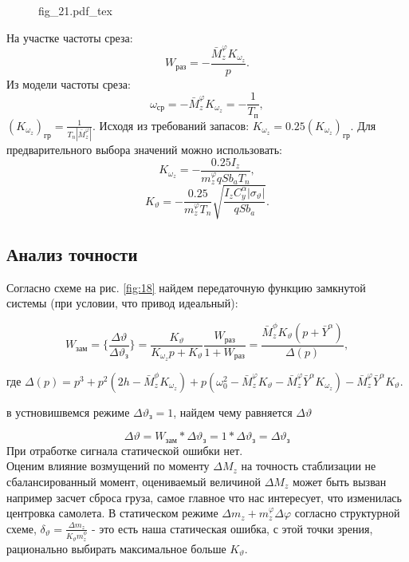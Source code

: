 \documentclass{article}
\begin{document}
\begin{figure}[H]
	\centering
	{fig_21.pdf_tex}
\end{figure}

На участке частоты среза:
\[
	W_\text{раз} = -\frac{\bar{M}_z^\varphi K_{\omega_z}}{p}.
\]
Из модели частоты среза:
\[
	\omega_\text{ср} = -\bar{M}_z^\varphi K_{\omega_z} = -\frac{1}{T_\text{п}},
\]
$(K_{\omega_z})_\text{гр} = \frac{1}{T_n |\bar{M}_z^\varphi|}.$
Исходя из требований запасов:
$K_{\omega_z} = 0.25 (K_{\omega_z})_\text{гр}.$
Для предварительного выбора значений можно использовать:
\[
	K_{\omega_z} = - \frac{0.25 I_z}{{m}_z^\varphi q S b_a T_n},
\]
\[
	K_{\vartheta} = - \frac{0.25}{{m}_z^\varphi T_n} \sqrt{\frac{I_z C_y^\alpha |\sigma_\vartheta|}{q S b_a}}.
\]

\subsection{Анализ точности}
Согласно схеме на рис. \ref{fig:18} найдем передаточную функцию замкнутой системы (при условии, что привод идеальный):

\begin{equation}
	W_\text{зам}= \{\frac{\Delta \vartheta}{\Delta \vartheta_\text{з}}\} =\frac{K_{\vartheta}}{K_{\omega_z}p +K_{\vartheta}}\frac{W_\text{раз}}{1 + W_\text{раз}} =\frac{\bar{M}_z^\phi K_{\vartheta}(p + \bar{Y}^\alpha)}{\Delta(p)},  
	\label{eq:w_zam_1}
\end{equation}

где $\Delta(p) = p^3 + p^2(2h - \bar{M}_z^\phi K_{\omega_z}) + p(\omega_0^2 -\bar{M}_z^\varphi K_\vartheta - \bar{M}_z^\varphi \bar{Y}^\alpha K_{\omega_z}) -\bar{M}_z^\varphi \bar{Y}^\alpha K_{\vartheta} $.

в устновишвемся режиме $\Delta \vartheta_\text{з} = 1$, найдем чему равняется $\Delta \vartheta$

\[
	\Delta \vartheta = W_\text{зам} * \Delta \vartheta_\text{з} = 1* \Delta \vartheta_\text{з} = \Delta \vartheta_\text{з}
\]
При отработке сигнала статической ошибки нет. \\
Оценим влияние возмущений по моменту $\Delta M_z$ на точность стаблизации не сбалансированный момент, оцениваемый величиной $\Delta M_z$ может быть вызван например засчет сброса груза, самое главное что нас интересует, что изменилась центровка самолета. В статическом режиме $\Delta m_z + m_z^\varphi \Delta \varphi$ согласно структурной схеме, $\delta_\vartheta =\frac{\Delta m_z}{K_\vartheta m_z^\phi}$ - это есть наша статическая ошибка, с этой точки зрения, рационально выбирать максимальное больше $K_\vartheta$.
\end{document}
